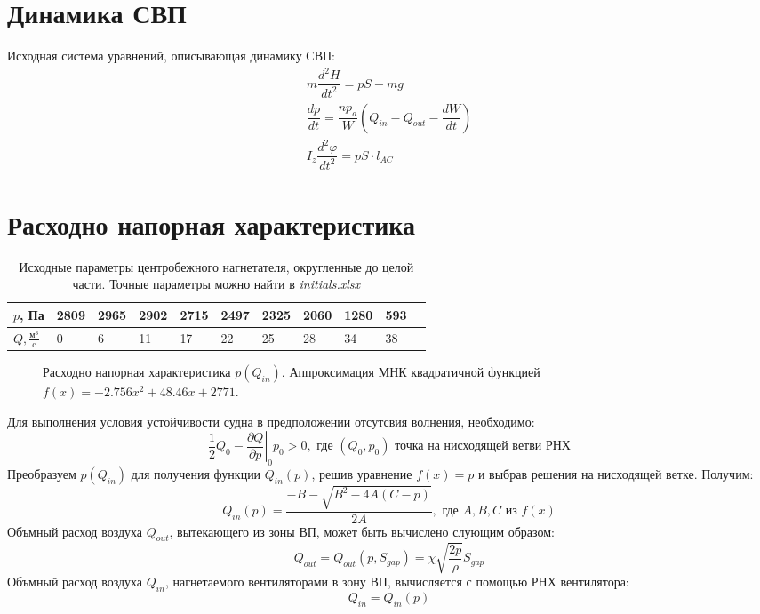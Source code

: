 \documentclass{article}%
\newcommand\at[2]{\left.#1\right|_{#2}}
\numberwithin{equation}{subsection}
\let\oldsection\section%
\renewcommand{\section}{%
  \renewcommand{\theequation}{\thesection.\arabic{equation}}%
  \oldsection}%
\begin{document}
\section{Динамика СВП}
Исходная система уравнений, описывающая динамику СВП:
\begin{equation}
\begin{gathered}
    m\dfrac{d^2H}{dt^2}=pS-mg\\
    \dfrac{dp}{dt}=\dfrac{np_a}{W}\left(Q_{in} - Q_{out} -\dfrac{dW}{dt}\right)\\
    I_z\dfrac{d^2\varphi}{dt^2}=pS\cdot l_{AC}
\end{gathered}
\label{eq:1.1}
\end{equation}

\section{Расходно напорная характеристика}
\begin{table}[h]
    \caption{Исходные параметры центробежного нагнетателя, округленные до целой части. Точные параметры можно найти в {\it initials.xlsx}}
    \centering
    \begin{tabular}{@{}l*{10}{l}@{}}
        \toprule
        $p$, Па & 2809 & 2965 & 2902 & 2715 & 2497 & 2325 & 2060 & 1280 & 593 \\
        \midrule
        $Q, \frac{\text{м}^3}{\text{c}}$ & 0 & 6 & 11 & 17 & 22 & 25 & 28 & 34 & 38 \\
        \bottomrule
    \end{tabular}
\end{table}
\begin{figure}[H]
    \centering
    
    \caption{Расходно напорная характеристика $p(Q_{in})$. Аппроксимация МНК квадратичной функцией $f(x)=-2.756x^2 + 48.46x + 2771$.}
\end{figure}
Для выполнения условия устойчивости судна в предположении отсутсвия волнения, необходимо:
\begin{equation}
    \dfrac{1}{2}Q_0 - \at{\dfrac{\partial Q}{\partial p}}{0}p_0 > 0, \text{ где } (Q_0, p_0) \text{ точка на нисходящей ветви РНХ}
\end{equation} 
Преобразуем $p(Q_{in})$ для получения функции $Q_{in}(p)$, решив уравнение $f(x)=p$ и выбрав решения на нисходящей ветке. Получим:
\begin{equation}
    Q_{in}(p)=\dfrac{-B-\sqrt{B^2-4A(C-p)}}{2A}, \text{ где } A, B, C \text{ из } f(x)
\end{equation}
Объмный расход воздуха $Q_{out}$, вытекающего из зоны ВП, может быть вычислено слующим образом:
\begin{equation}
    Q_{out}=Q_{out}(p, S_{gap})=\chi\sqrt{\dfrac{2p}{\rho}}S_{gap}
\end{equation}
Объмный расход воздуха $Q_{in}$, нагнетаемого вентиляторами в зону ВП, вычисляется с помощью РНХ вентилятора:
\begin{equation}
    Q_{in}=Q_{in}(p)
\end{equation}
\end{document}
